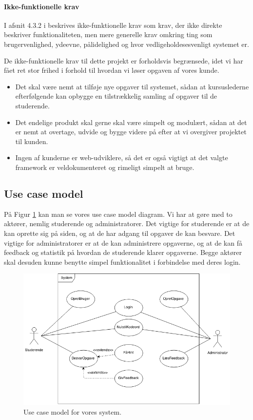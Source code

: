 \documentclass[11pt, a4paper]{article}
\begin{document}
\paragraph{Ikke-funktionelle krav}
\label{par:ikke_funktionelle_krav}
I afsnit 4.3.2 i \cite{OOSE} beskrives ikke-funktionelle krav som krav, der ikke direkte beskriver funktionaliteten, men mere generelle krav omkring ting som brugervenlighed, ydeevne, pålidelighed og hvor vedligeholdesesvenligt systemet er.

De ikke-funktionelle krav til dette projekt er forholdsvis begrænsede, idet vi har fået ret stor frihed i forhold til hvordan vi løser opgaven af vores kunde.

\begin{itemize}
\item Det skal være nemt at tilføje nye opgaver til systemet, sådan at kursuslederne efterfølgende kan opbygge en tilstrækkelig samling af opgaver til de studerende.
\item Det endelige produkt skal gerne skal være simpelt og modulært, sådan at det er nemt at overtage, udvide og bygge videre på efter at vi overgiver projektet til kunden.
\item Ingen af kunderne er web-udviklere, så det er også vigtigt at det valgte framework er veldokumenteret og rimeligt simpelt at bruge.
\end{itemize}

\subsection{Use case model}
\label{sub:use_case_model}
På Figur \ref{fig:use_case_model} kan man se vores use case model diagram. Vi har at gøre med to aktører, nemlig studerende og administratorer. Det vigtige for studerende er at de kan oprette sig på siden, og at de har adgang til opgaver de kan besvare. Det vigtige for administratorer er at de kan administrere opgaverne, og at de kan få feedback og statistik på hvordan de studerende klarer opgaverne. Begge aktører skal desuden kunne benytte simpel funktionalitet i forbindelse med deres login.
\begin{figure}[h]
  \centering
  \includegraphics[width=0.8\linewidth]{figures/UseCaseModel.png}
  \caption{Use case model for vores system.}
  \label{fig:use_case_model}
\end{figure}
\end{document}
